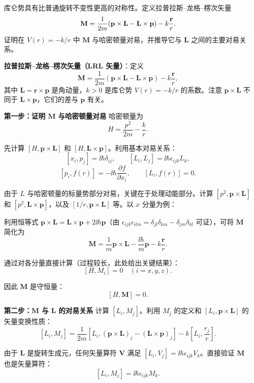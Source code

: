 \begin{question}
库仑势具有比普通旋转不变性更高的对称性。定义拉普拉斯--龙格--楞次矢量
\[
\mathbf M={1\over2m}(\mathbf p\times\mathbf L-\mathbf L\times\mathbf p)-k{\mathbf r\over r}.
\]
证明在 $V(r)=-k/r$ 中 $\mathbf M$ 与哈密顿量对易，并推导它与 $\mathbf L$ 之间的主要对易关系。
\end{question}
\begin{solution}
	\textbf{拉普拉斯--龙格--楞次矢量（LRL 矢量）}：定义
	\[
	\mathbf M = \frac{1}{2m}(\mathbf p\times\mathbf L - \mathbf L\times\mathbf p) - k\frac{\mathbf r}{r},
	\]
	其中 $\mathbf L=\mathbf r\times\mathbf p$ 是角动量，$k>0$ 是库仑势 $V(r)=-k/r$ 的系数。注意 $\mathbf p\times\mathbf L$ 不同于 $\mathbf L\times\mathbf p$，它们的差与 $\mathbf p$ 有关。

	\textbf{第一步：证明 $\mathbf M$ 与哈密顿量对易} 哈密顿量为
	\[
	H = \frac{p^2}{2m} - \frac{k}{r}.
	\]

	先计算 $[H,\mathbf p\times\mathbf L]$ 和 $[H,\mathbf L\times\mathbf p]$。利用基本对易关系：
	\[
	[x_i,p_j] = \ii\hbar\delta_{ij},\qquad [L_i,L_j]=\ii\hbar\epsilon_{ijk}L_k,
	\]
	\[
	[p_i,f(r)] = -\ii\hbar\frac{\partial f}{\partial x_i},\qquad
	[L_i,f(r)] = 0.
	\]

	由于 $L$ 与哈密顿量的标量势部分对易，关键在于处理动能部分。计算 $[p^2,\mathbf p\times\mathbf L]$ 和 $[p^2,\mathbf L\times\mathbf p]$，以及 $[1/r,\mathbf p\times\mathbf L]$ 等。以 $x$ 分量为例：

	利用恒等式 $\mathbf p\times\mathbf L = \mathbf L\times\mathbf p + 2\ii\hbar\mathbf p$（由 $\epsilon_{ijk}\epsilon_{ilm}=\delta_{jl}\delta_{km}-\delta_{jm}\delta_{kl}$ 可证），可将 $\mathbf M$ 简化为
	\[
	\mathbf M = \frac{1}{m}\mathbf p\times\mathbf L - \frac{\ii\hbar}{m}\mathbf p - k\frac{\mathbf r}{r}.
	\]

	通过对各分量直接计算（过程较长，此处给出关键结果）：
	\[
	[H,M_i] = 0\quad (i=x,y,z).
	\]

	因此 $\mathbf M$ 是守恒量：
	\[
	\boxed{[H,\mathbf M]=0}.
	\]

	\textbf{第二步：$\mathbf M$ 与 $\mathbf L$ 的对易关系} 计算 $[L_i,M_j]$。利用 $M_j$ 的定义和 $[L_i,\mathbf p\times\mathbf L]$ 的矢量变换性质：
	\[
	[L_i,M_j] = \frac{1}{2m}[L_i,(\mathbf p\times\mathbf L)_j - (\mathbf L\times\mathbf p)_j] - k\left[L_i,\frac{r_j}{r}\right].
	\]

	由于 $\mathbf L$ 是旋转生成元，任何矢量算符 $\mathbf V$ 满足 $[L_i,V_j]=\ii\hbar\epsilon_{ijk}V_k$。直接验证 $\mathbf M$ 也是矢量算符：
	\[
	[L_i,M_j] = \ii\hbar\epsilon_{ijk}M_k.
	\]


\end{solution}
